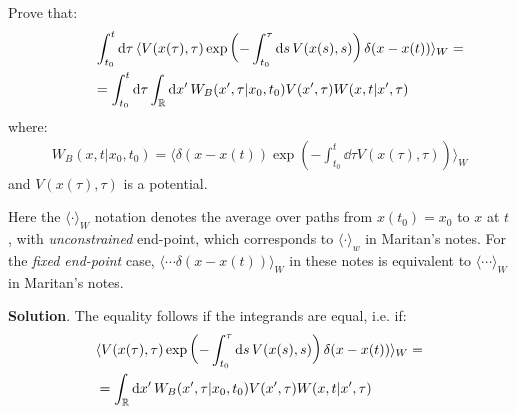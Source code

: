 \documentclass[../template.tex]{subfiles}
\begin{document}
\begin{exo} Prove that:
    \begin{align*}
        \int_{t_0}^t \dd{\tau} \langle V(x(\tau), \tau) \exp\left(-\int_{t_0}^\tau \dd{s} V(x(s),s)\right) \delta(x-x(t)) \rangle_W =\\
        = \int_{t_0}^t \dd{\tau} \int_{\mathbb{R}} \dd{x'} W_B(x',\tau|x_0,t_0) V(x',\tau)W(x,t|x',\tau) \span
    \end{align*}
    where:
    \begin{align*}
        W_B(x,t|x_0,t_0) = \langle \delta(x-x(t)) \exp\left(-\int_{t_0}^t \dd{\tau} V(x(\tau), \tau)\right) \rangle_W
    \end{align*}
    and $V(x(\tau),\tau)$ is a potential.

    \begin{expl}
        Here the $\langle \cdot \rangle_W$ notation denotes the average over paths from $x(t_0) = x_0$ to $x$ at $t$, with \textit{unconstrained} end-point, which corresponds to $\langle \cdot \rangle_w$ in Maritan's notes. For the \textit{fixed end-point} case,  $\langle \cdots \delta(x-x(t))\rangle_W$ in these notes is equivalent to $\langle \cdots \rangle_W$ in Maritan's notes.
    \end{expl} 
    \medskip

    \textbf{Solution}. The equality follows if the integrands are equal, i.e. if:
    \begin{align*}
        \langle V(x(\tau), \tau) \exp\left(-\int_{t_0}^\tau \dd{s} V(x(s),s)\right) \delta(x-x(t))\rangle_W = \span\\
        &= \int_{\mathbb{R}}\dd{x'} W_B(x',\tau|x_0,t_0) V(x',\tau) W(x,t|x',\tau)
    \end{align*} 


\end{exo}
\end{document}
